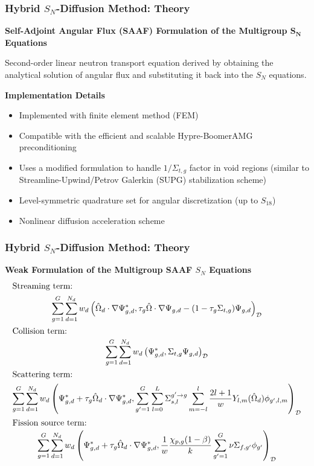 \begin{frame}
  \frametitle{Hybrid $S_N$-Diffusion Method: Theory}
  \textbf{Self-Adjoint Angular Flux (SAAF) Formulation of the Multigroup $\bm{S_N}$ Equations}
  \vspace{.2cm}

  Second-order linear neutron transport equation derived by obtaining the analytical solution of
  angular flux and substituting it back into the $S_N$ equations.

  \begin{block}{\textbf{Implementation Details}}
    \begin{itemize}
      \item Implemented with finite element method (FEM)
      \item Compatible with the efficient and scalable Hypre-BoomerAMG preconditioning
      \item Uses a modified formulation to handle $1/\Sigma_{t,g}$ factor in void regions (similar to
        Streamline-Upwind/Petrov Galerkin (SUPG) stabilization scheme) \cite{wang_diffusion_2014}
      \item Level-symmetric quadrature set for angular discretization (up to $S_{18}$)
      \item Nonlinear diffusion acceleration scheme \cite{wang_diffusion_2014}
    \end{itemize}
  \end{block}
\end{frame}

\begin{frame}
  \frametitle{Hybrid $S_N$-Diffusion Method: Theory}
  \textbf{Weak Formulation of the Multigroup SAAF $S_N$ Equations}
  \begin{gather}
    \shortintertext{Streaming term:}
    \sum^G_{g=1}\sum^{N_d}_{d=1}w_d\left(\hat{\Omega}_d\cdot\nabla\Psi^*_{g,d},\tau_g\hat{\Omega}
    \cdot\nabla\Psi_{g,d}-(1-\tau_g\Sigma_{t,g})\Psi_{g,d}\right)_\mathcal{D} \\
    \shortintertext{Collision term: }
    \sum^G_{g=1}\sum^{N_d}_{d=1}w_d\left(\Psi^*_{g,d},\Sigma_{t,g}\Psi_{g,d}\right)_\mathcal{D} \\
    \shortintertext{Scattering term:}
    \sum^G_{g=1}\sum^{N_d}_{d=1}w_d\left(\Psi^*_{g,d}+\tau_g\hat{\Omega}_d\cdot\nabla\Psi^*_{g,d},
    \sum^G_{g'=1}\sum^L_{l=0}\Sigma^{g'\rightarrow g}_{s,l}\sum^l_{m=-l}
    \frac{2l+1}{w}Y_{l,m}(\hat{\Omega}_d)\phi_{g',l,m}\right)_\mathcal{D} \\
    \shortintertext{Fission source term: }
    \sum^G_{g=1}\sum^{N_d}_{d=1}w_d\left(\Psi^*_{g,d}+\tau_g\hat{\Omega}_d\cdot\nabla\Psi^*_{g,d},
    \frac{1}{w}\frac{\chi_{p,g}(1-\beta)}{k}\sum^G_{g'=1}\nu\Sigma_{f,g'}\phi_{g'}\right)_\mathcal{D}
  \end{gather}
\end{frame}

